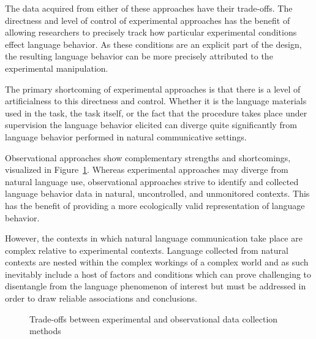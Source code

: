 \documentclass[
  letterpaper,
  krantz1]{latex/krantz-mod}
\theoremstyle{definition}
\theoremstyle{definition}
\theoremstyle{remark}
\begin{document}
The data acquired from either of these approaches have their trade-offs.
The directness and level of control of experimental approaches has the
benefit of allowing researchers to precisely track how particular
experimental conditions effect language behavior. As these conditions
are an explicit part of the design, the resulting language behavior can
be more precisely attributed to the experimental manipulation.

The primary shortcoming of experimental approaches is that there is a
level of artificialness to this directness and control. Whether it is
the language materials used in the task, the task itself, or the fact
that the procedure takes place under supervision the language behavior
elicited can diverge quite significantly from language behavior
performed in natural communicative settings.

Observational approaches show complementary strengths and shortcomings,
visualized in Figure~\ref{fig-data-collection-methods}. Whereas
experimental approaches may diverge from natural language use,
observational approaches strive to identify and collected language
behavior data in natural, uncontrolled, and unmonitored contexts. This
has the benefit of providing a more ecologically valid representation of
language behavior.

However, the contexts in which natural language communication take place
are complex relative to experimental contexts. Language collected from
natural contexts are nested within the complex workings of a complex
world and as such inevitably include a host of factors and conditions
which can prove challenging to disentangle from the language phenomenon
of interest but must be addressed in order to draw reliable associations
and conclusions.

\begin{figure}[!htb]


\caption{\label{fig-data-collection-methods}Trade-offs between
experimental and observational data collection methods}

\end{figure}%
\end{document}
